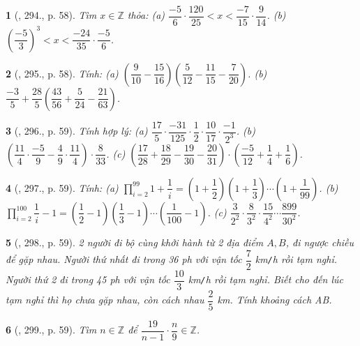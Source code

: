 \documentclass{article}
\newtheorem{baitoan}{}
\begin{document}
\begin{baitoan}[\cite{Tuyen_Toan_6}, 294., p. 58]
	Tìm $x\in\mathbb{Z}$ thỏa: (a) $\dfrac{-5}{6}\cdot\dfrac{120}{25} < x < \dfrac{-7}{15}\cdot\dfrac{9}{14}$. (b) $\left(\dfrac{-5}{3}\right)^3 < x < \dfrac{-24}{35}\cdot\dfrac{-5}{6}$.
\end{baitoan}

\begin{baitoan}[\cite{Tuyen_Toan_6}, 295., p. 58]
	Tính: (a) $\left(\dfrac{9}{10} - \dfrac{15}{16}\right)\left(\dfrac{5}{12} - \dfrac{11}{15} - \dfrac{7}{20}\right)$. (b) $\dfrac{-3}{5} + \dfrac{28}{5}\left(\dfrac{43}{56} + \dfrac{5}{24} - \dfrac{21}{63}\right)$.
\end{baitoan}

\begin{baitoan}[\cite{Tuyen_Toan_6}, 296., p. 59]
	Tính hợp lý: (a) $\dfrac{17}{5}\cdot\dfrac{-31}{125}\cdot\dfrac{1}{2}\cdot\dfrac{10}{17}\cdot\dfrac{-1}{2^3}$. (b) $\left(\dfrac{11}{4}\cdot\dfrac{-5}{9} - \dfrac{4}{9}\cdot\dfrac{11}{4}\right)\cdot\dfrac{8}{33}$. (c) $\left(\dfrac{17}{28} + \dfrac{18}{29} - \dfrac{19}{30} - \dfrac{20}{31}\right)\cdot\left(\dfrac{-5}{12} + \dfrac{1}{4} + \dfrac{1}{6}\right)$.
\end{baitoan}

\begin{baitoan}[\cite{Tuyen_Toan_6}, 297., p. 59]
	Tính: (a) $\prod_{i=2}^{99} 1 + \dfrac{1}{i} = \left(1 + \dfrac{1}{2}\right)\left(1 + \dfrac{1}{3}\right)\cdots\left(1 + \dfrac{1}{99}\right)$. (b) $\prod_{i=2}^{100} \dfrac{1}{i} - 1 = \left(\dfrac{1}{2} - 1\right)\left(\dfrac{1}{3} - 1\right)\cdots\left(\dfrac{1}{100} - 1\right)$. (c) $\dfrac{3}{2^2}\cdot\dfrac{8}{3^2}\cdot\dfrac{15}{4^2}\cdots\dfrac{899}{30^2}$.
\end{baitoan}

\begin{baitoan}[\cite{Tuyen_Toan_6}, 298., p. 59]
	2 người đi bộ cùng khởi hành từ 2 địa điểm $A,B$, đi ngược chiều để gặp nhau. Người thứ nhất đi trong {\rm36 ph} với vận tốc $\dfrac{7}{2}$ {\rm km{\tt/}h} rồi tạm nghỉ. Người thứ 2 đi trong {\rm45 ph} với vận tốc $\dfrac{10}{3}$ {\rm km{\tt/}h} rồi tạm nghỉ. Biết cho đến lúc tạm nghỉ thì họ chưa gặp nhau, còn cách nhau $\dfrac{2}{5}$ {\rm km}. Tính khoảng cách AB.
\end{baitoan}

\begin{baitoan}[\cite{Tuyen_Toan_6}, 299., p. 59]
	Tìm $n\in\mathbb{Z}$ để $\dfrac{19}{n - 1}\cdot\dfrac{n}{9}\in\mathbb{Z}$.
\end{baitoan}
\end{document}
